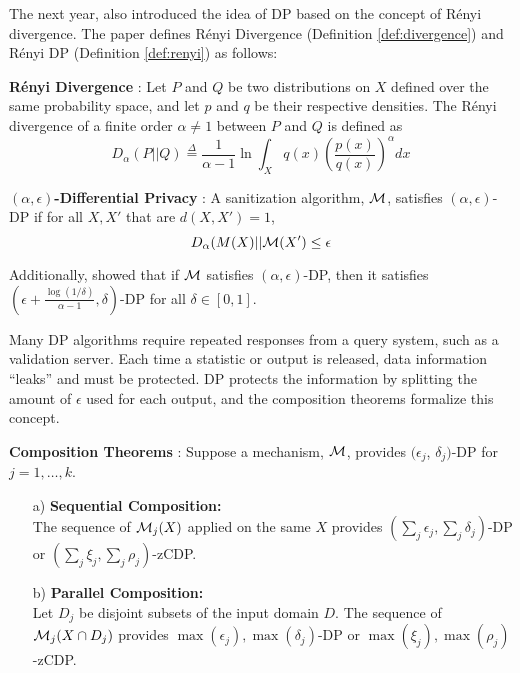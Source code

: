The next year, \citet{mironov2017renyi} also introduced the idea of DP based on the concept of R\'enyi divergence. The paper defines R\'enyi Divergence (Definition \ref{def:divergence}) and R\'enyi DP (Definition \ref{def:renyi}) as follows:

\begin{defn}\label{def:divergence} \textbf{R\'enyi Divergence} \citep{renyi1961measures}: Let $P$ and $Q$ be two distributions on $X$ defined over the same probability space, and let $p$ and $q$ be their respective densities. The R\'enyi divergence of a finite order $\alpha\neq1$ between $P$ and $Q$ is defined as
    \begin{equation}
        D_\alpha(P||Q)\stackrel{\Delta}{=}\frac{1}{\alpha-1}\ln\int_X q(x)\left(\frac{p(x)}{q(x)}\right)^\alpha dx
    \end{equation}
\end{defn}

\begin{defn}\label{def:renyi} \textbf{$(\alpha, \epsilon)$-Differential Privacy} \citep{mironov2017renyi}: A sanitization algorithm, $\mathcal{M}$, satisfies $(\alpha, \epsilon)$-DP if for all $X, X'$ that are $d(X,X')=1$,
    \begin{equation}
        D_\alpha(M(X)||\mathcal{M}(X')\leq\epsilon
    \end{equation}
\end{defn}

Additionally, \citet{mironov2017renyi} showed that if $\mathcal{M}$ satisfies $(\alpha,\epsilon)$-DP, then it satisfies $\left(\epsilon + \frac{\log(1/\delta)}{\alpha-1}, \delta \right)$-DP for all $\delta\in[0,1]$.

Many DP algorithms require repeated responses from a query system, such as a validation server. Each time a statistic or output is released, data information ``leaks'' and must be protected. DP protects the information by splitting the amount of $\epsilon$ used for each output, and the composition theorems formalize this concept.

\begin{thm}\label{thm:comp} \textbf{Composition Theorems} \citep{mcsherry2009privacy,dwork2016concentrated,bun2016concentrated}:
Suppose a mechanism, $\mathcal{M}$, provides $(\epsilon_j$, $\delta_j)$-DP for $j=1,\ldots,k$.
  \begin{itemize}\setlength{\itemindent}{15pt}
  \item[a)] \textbf{Sequential Composition:}\\
    The sequence of $\mathcal{M}_j(X)$ applied on the same $X$ provides $(\sum_j\epsilon_j,\sum_j\delta_j)$-DP or $(\sum_j\xi_j,\sum_j\rho_j)$-zCDP.
  \item[b)] \textbf{Parallel Composition:}\\
    Let  $D_j$ be disjoint subsets of the input domain $D$. The sequence of $\mathcal{M}_j(X\cap D_j)$ provides $\max(\epsilon_j), \max(\delta_j)$-DP or $\max(\xi_j), \max(\rho_j)$-zCDP.
  \end{itemize}
\end{thm}

